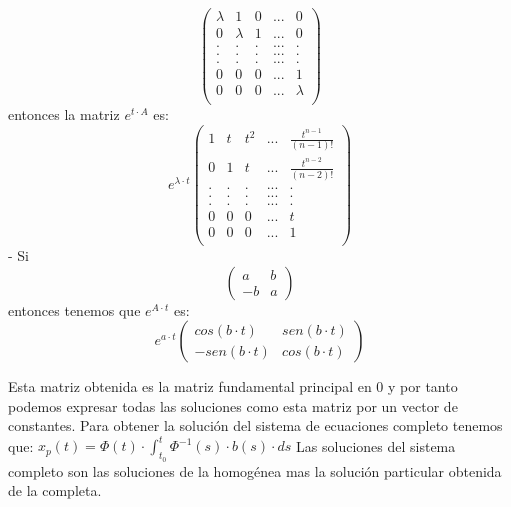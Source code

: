 \begin{sol}
$$\begin{pmatrix}
	\lambda & 1 & 0 & ... & 0 \\
	0 & \lambda & 1 & ... & 0 \\
	. & . & . & ... & . \\
	. & . & . & ... & . \\
	. & . & . & ... & . \\
	0 & 0 & 0 & ... & 1 \\
	0 & 0 & 0 & ... & \lambda \\
	\end{pmatrix}
	$$  
	entonces la matriz $e^{t\cdot A}$ es:  
	$$
	e^{\lambda \cdot t}
	\begin{pmatrix}
	1 & t & t^2 & ... & \frac{t^{n-1}}{(n-1)!} \\
	0 & 1 & t & ... & \frac{t^{n-2}}{(n-2)!} \\
	. & . & . & ... & . \\
	. & . & . & ... & . \\
	. & . & . & ... & . \\
	0 & 0 & 0 & ... & t \\
	0 & 0 & 0 & ... & 1 \\
	\end{pmatrix}
	$$
	- Si
	$$
	\begin{pmatrix}
	a & b \\
	-b & a
	\end{pmatrix}
	$$
	entonces tenemos que $e^{A\cdot t}$ es:
	$$
	e^{a\cdot t}
	\begin{pmatrix}
	cos(b\cdot t) & sen(b\cdot t) \\
	-sen(b\cdot t) & cos(b\cdot t)
	\end{pmatrix}
	$$
	
	Esta matriz obtenida es la matriz fundamental principal en 0 y por tanto podemos expresar todas las soluciones como esta matriz por un vector de constantes.  
	Para obtener la solución del sistema de ecuaciones completo tenemos que:  
	$x_p(t) = \Phi(t)\cdot \int_{t_0}^{t}\Phi^{-1}(s)\cdot b(s)\cdot ds$  
	Las soluciones del sistema completo son las soluciones de la homogénea mas la solución particular obtenida de la completa.
\end{sol}
